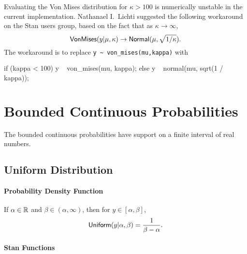 Evaluating the Von Mises distribution for $\kappa > 100$ is
numerically unstable in the current implementation.  Nathanael I.\
Lichti suggested the following workaround on the Stan users group,
based on the fact that as $\kappa \rightarrow \infty$,
\[
\distro{VonMises}(y|\mu,\kappa) \rightarrow \distro{Normal}(\mu,
\sqrt{1 / \kappa}).
\]
%
The workaround is to replace \Verb|y ~ von_mises(mu,kappa)| with
%
\begin{stancode}
if (kappa < 100)
  y ~ von_mises(mu, kappa);
else
  y ~ normal(mu, sqrt(1 / kappa));
\end{stancode}


\chapter{Bounded Continuous Probabilities}

\noindent
The bounded continuous probabilities have support on a finite interval
of real numbers.



\section{Uniform Distribution}

\subsubsection{Probability Density Function}

If $\alpha \in \reals$ and $\beta \in (\alpha,\infty)$, then for $y
\in [\alpha,\beta]$,
\[
\distro{Uniform}(y|\alpha,\beta)
=
\frac{1}{\beta - \alpha}
.
\]


\subsubsection{Stan Functions}

